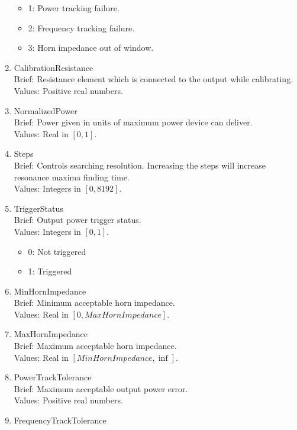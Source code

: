 \documentclass{article}
\begin{document}
\begin{enumerate}
\begin{itemize}
                  \item 1: Power tracking failure.
                  \item 2: Frequency tracking failure.
                  \item 3: Horn impedance out of window.
            \end{itemize}
      \item CalibrationResistance
            \\ Brief: Resistance element which is connected to the output while calibrating.
            \\ Values: Positive real numbers.
      \item NormalizedPower
            \\ Brief: Power given in units of maximum power device can deliver.
            \\ Values: Real in $[0, 1]$.
      \item Steps
            \\ Brief: Controls searching resolution. Increasing the steps will increase 
            resonance maxima finding time.
            \\ Values: Integers in $[0, 8192]$.
      \item TriggerStatus
            \\ Brief: Output power trigger status.
            \\ Values: Integers in $[0, 1]$.
            \begin{itemize}
                  \item 0: Not triggered
                  \item 1: Triggered
            \end{itemize}
      \item MinHornImpedance
            \\ Brief: Minimum acceptable horn impedance.
            \\ Values: Real in $[0, MaxHornImpedance]$.
      \item MaxHornImpedance
            \\ Brief: Maximum acceptable horn impedance.
            \\ Values: Real in $[MinHornImpedance, \inf]$.
      \item PowerTrackTolerance
            \\ Brief: Maximum acceptable output power error. 
            \\ Values: Positive real numbers.
      \item FrequencyTrackTolerance

\end{enumerate}
\end{document}
